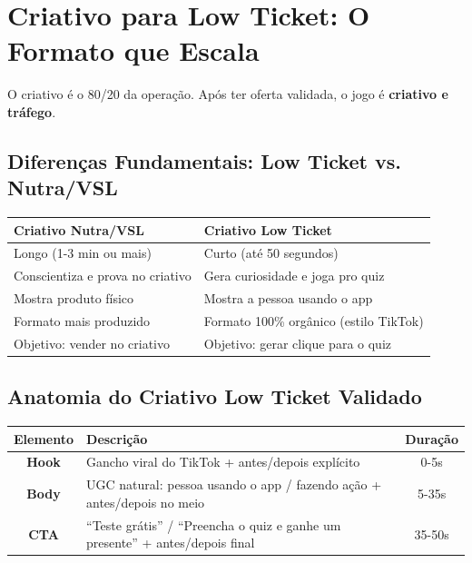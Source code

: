 \documentclass[12pt, a4paper]{article}
\begin{document}
\needspace{10cm}

\section{Criativo para Low Ticket: O Formato que Escala}

O criativo é o 80/20 da operação. Após ter oferta validada, o jogo é \textbf{criativo e tráfego}.

\subsection{Diferenças Fundamentais: Low Ticket vs. Nutra/VSL}

\begin{table}[H]
    \centering
    \renewcommand{\arraystretch}{1.4}
    \begin{tabularx}{\textwidth}{X X}
        \toprule
        \rowcolor{tableHeader} \textbf{Criativo Nutra/VSL} & \textbf{Criativo Low Ticket} \\
        \midrule
        Longo (1-3 min ou mais) & Curto (até 50 segundos) \\
        \rowcolor{lightGray}
        Conscientiza e prova no criativo & Gera curiosidade e joga pro quiz \\
        Mostra produto físico & Mostra a pessoa usando o app \\
        \rowcolor{lightGray}
        Formato mais produzido & Formato 100\% orgânico (estilo TikTok) \\
        Objetivo: vender no criativo & Objetivo: gerar clique para o quiz \\
        \bottomrule
    \end{tabularx}
\end{table}

\subsection{Anatomia do Criativo Low Ticket Validado}

\begin{table}[H]
    \centering
    \renewcommand{\arraystretch}{1.5}
    \begin{tabularx}{\textwidth}{c X c}
        \toprule
        \rowcolor{tableHeader} \textbf{Elemento} & \textbf{Descrição} & \textbf{Duração} \\
        \midrule
        \textbf{Hook} & Gancho viral do TikTok + antes/depois explícito & 0-5s \\
        \rowcolor{lightGray}
        \textbf{Body} & UGC natural: pessoa usando o app / fazendo ação + antes/depois no meio & 5-35s \\
        \textbf{CTA} & ``Teste grátis'' / ``Preencha o quiz e ganhe um presente'' + antes/depois final & 35-50s \\
        \bottomrule
    \end{tabularx}
\end{table}
\end{document}
